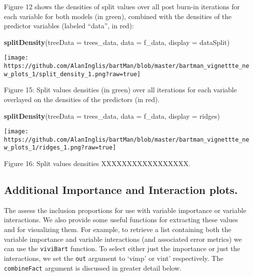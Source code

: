 \documentclass[
]{article}
\newenvironment{Shaded}{\begin{snugshade}}{\end{snugshade}}
\newcommand{\AttributeTok}[1]{\textcolor[rgb]{0.13,0.29,0.53}{#1}}
\newcommand{\FunctionTok}[1]{\textcolor[rgb]{0.13,0.29,0.53}{\textbf{#1}}}
\newcommand{\NormalTok}[1]{#1}
\newcommand{\StringTok}[1]{\textcolor[rgb]{0.31,0.60,0.02}{#1}}
\begin{document}
Figure 12 shows the densities of split values over all post burn-in
iterations for each variable for both models (in green), combined with
the densities of the predictor variables (labeled ``data'', in red):

\begin{Shaded}
\begin{Highlighting}[]
\FunctionTok{splitDensity}\NormalTok{(}\AttributeTok{treeData =}\NormalTok{ trees\_data, }\AttributeTok{data =}\NormalTok{ f\_data, }\AttributeTok{display =} \StringTok{\textquotesingle{}dataSplit\textquotesingle{}}\NormalTok{)}
\end{Highlighting}
\end{Shaded}

\begin{center}\texttt{[image: https://github.com/AlanInglis/bartMan/blob/master/bartman\_vignettte\_new\_plots\_1/split\_density\_1.png?raw=true]} \end{center}

\protect\hypertarget{fig15:fig15}{}{Figure 15: } Split values densities
(in green) over all iterations for each variable overlayed on the
densities of the predictors (in red).

\begin{Shaded}
\begin{Highlighting}[]
\FunctionTok{splitDensity}\NormalTok{(}\AttributeTok{treeData =}\NormalTok{ trees\_data, }\AttributeTok{data =}\NormalTok{ f\_data, }\AttributeTok{display =} \StringTok{\textquotesingle{}ridges\textquotesingle{}}\NormalTok{)}
\end{Highlighting}
\end{Shaded}

\begin{center}\texttt{[image: https://github.com/AlanInglis/bartMan/blob/master/bartman\_vignettte\_new\_plots\_1/ridges\_1.png?raw=true]} \end{center}

\protect\hypertarget{fig16:fig16}{}{Figure 16: } Split values densities
XXXXXXXXXXXXXXXXX.

\hypertarget{additional-importance-and-interaction-plots.}{%
\subsection{Additional Importance and Interaction
plots.}\label{additional-importance-and-interaction-plots.}}

The assess the inclusion proportions for use with variable importance or
variable interactions. We also provide some useful functions for
extracting these values and for visualizing them. For example, to
retrieve a list containing both the variable importance and variable
interactions (and associated error metrics) we can use the
\texttt{viviBart} function. To select either just the importance or just
the interactions, we set the \texttt{out} argument to `vimp' or vint'
respectively. The \texttt{combineFact} argument is discussed in greater
detail below.
\end{document}
